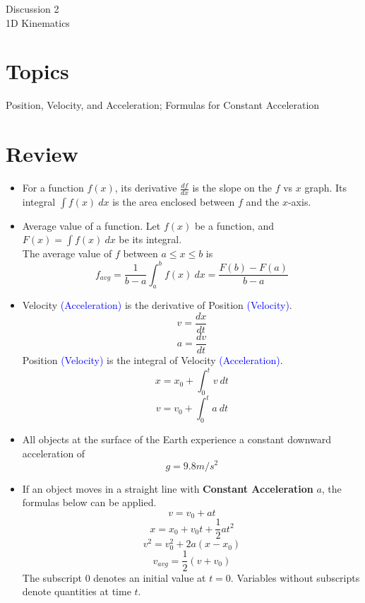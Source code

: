 \documentclass[11pt]{article}
\theoremstyle{gangnamstyle}{\newtheorem{definition}{Definition}[]}
\theoremstyle{gangnamstyle}{\newtheorem{example}{Example}[]}
\theoremstyle{gangnamstyle}{\newtheorem{problem}{Problem}[]}
\begin{document}
\normalfont
\pagestyle{pages}


\begin{center}
\vspace{3in}
{\Large Discussion 2 } \\ [0.05in]
1D Kinematics \\ [-0.5in]
\end{center}

\section*{Topics}
Position, Velocity, and Acceleration; Formulas for Constant Acceleration

\section{Review}

\begin{itemize}
\item For a function $f(x)$, its derivative $\frac{df}{dx}$ is the slope on the $f$ vs $x$ graph. Its integral $\int f(x) \ dx$ is the area enclosed between $f$ and the $x$-axis. 

\item Average value of a function. Let $f(x)$ be a function, and $F(x) = \int f(x) \ dx$ be its integral. \\
The average value of $f$ between $a \leq x \leq b$ is
\[ f_{avg} = \frac{1}{b - a} \int_a^b f(x) \ dx = \frac{F(b) - F(a)}{b - a} \]

\item Velocity \textcolor{blue}{(Acceleration)} is the derivative of Position \textcolor{blue}{(Velocity)}. 
\[ v = \frac{dx}{dt} \]
\[ a = \frac{dv}{dt} \]
Position \textcolor{blue}{(Velocity)} is the integral of Velocity \textcolor{blue}{(Acceleration)}. 
\[ x = x_0 + \int_0^t v \ dt \]
\[ v = v_0 + \int_0^t a \ dt \]

\item All objects at the surface of the Earth experience a constant downward acceleration of 
\[ g = 9.8 m/s^2 \]

\item If an object moves in a straight line with \textbf{Constant Acceleration} $a$, the formulas below can be applied. 
\[ v = v_0 + at \]
\[ x = x_0 + v_0t + \frac{1}{2}at^2 \]
\[ v^2 = v_0^2 + 2a(x - x_0) \]
\[ v_{avg} = \frac{1}{2}(v + v_0) \]
The subscript $0$ denotes an initial value at $t = 0$. Variables without subscripts denote quantities at time $t$. 
\end{itemize}


\end{document}
